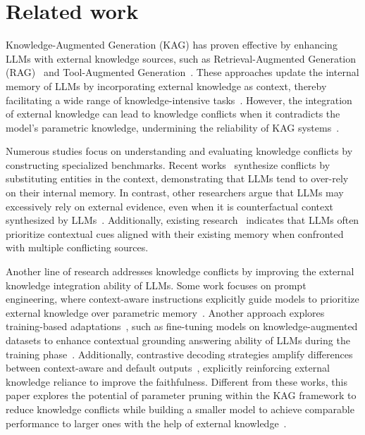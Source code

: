 \section{Related work}
Knowledge-Augmented Generation (KAG) has proven effective by enhancing LLMs with external knowledge sources, such as Retrieval-Augmented Generation (RAG)~\cite{lewis2020retrieval, ram2023context, shi2023replug, yao2022react} and Tool-Augmented Generation~\cite{schick2023toolformer,qin2024tool}. These approaches update the internal memory of LLMs by incorporating external knowledge as context, thereby facilitating a wide range of knowledge-intensive tasks~\cite{zheng2023can, lin2023ra, li2024rag}. However, the integration of external knowledge can lead to knowledge conflicts when it contradicts the model’s parametric knowledge, undermining the reliability of KAG systems~\cite{chen2022rich, longpre2021entity, yu2023characterizing, xie2023adaptive,bi2024factuality}.

Numerous studies focus on understanding and evaluating knowledge conflicts by constructing specialized benchmarks. Recent works~\cite{longpre2021entity, jin2024tug} synthesize conflicts by substituting entities in the context, demonstrating that LLMs tend to over-rely on their internal memory. In contrast, other researchers argue that LLMs may excessively rely on external evidence, even when it is counterfactual context synthesized by LLMs~\cite{xie2023adaptive,tan2024blinded}. Additionally, existing research~\cite{kortukovstudying, xie2023adaptive} indicates that LLMs often prioritize contextual cues aligned with their existing memory when confronted with multiple conflicting sources. 

Another line of research addresses knowledge conflicts by improving the external knowledge integration ability of LLMs. Some work focuses on prompt engineering, where context-aware instructions explicitly guide models to prioritize external knowledge over parametric memory~\cite{zhou2023context, wang2023resolving}. Another approach explores training-based adaptations~\cite{xue2023improving,bi2024context}, such as fine-tuning models on knowledge-augmented datasets to enhance contextual grounding answering ability of LLMs during the training phase~\cite{li2022large, fang2023getting,mo2024mitigating,neeman2022disentqa}. Additionally, contrastive decoding strategies amplify differences between context-aware and default outputs~\cite{shi2023trusting,bi2024decoding,jin2024tug}, explicitly reinforcing external knowledge reliance to improve the faithfulness. Different from these works, this paper explores the potential of parameter pruning within the KAG framework to reduce knowledge conflicts while building a smaller model to achieve comparable performance to larger ones with the help of external knowledge~\cite{asai2024reliable,borgeaud2022improving}.
